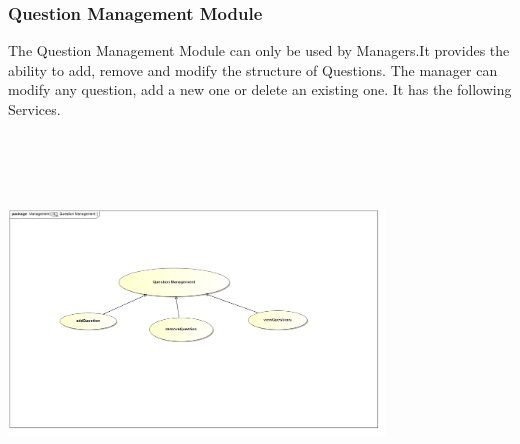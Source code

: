 \documentclass[english]{article}
\begin{document}
		\subsubsection{Question Management Module}
		The Question Management Module can only be used by Managers.It provides the ability to add, remove and modify the structure of Questions. The manager can modify any question, add a new one or delete an existing one. It has the following Services.
		
		\includegraphics[width=10cm,height=10cm,keepaspectratio]{questionManagement.jpg}
		
\end{document}
